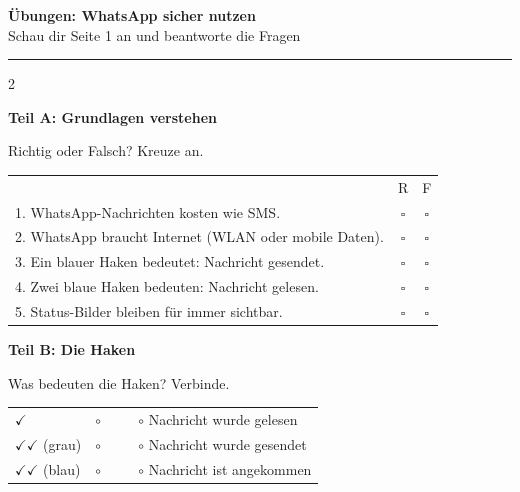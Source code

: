 \documentclass[a4paper,landscape,8pt]{extarticle}
\begin{document}
\newpage


\begin{center}
{\LARGE\bfseries Übungen: WhatsApp sicher nutzen}\\[3pt]
{\normalsize Schau dir Seite 1 an und beantworte die Fragen}
\end{center}

\vspace{3mm}
\hrule
\vspace{4mm}

\begin{multicols}{2}

\textbf{\large Teil A: Grundlagen verstehen}

Richtig oder Falsch? Kreuze an.

\vspace{2mm}

\renewcommand{\arraystretch}{1.6}
\begin{tabular}{@{}p{8cm}cc@{}}
& R & F \\
1. WhatsApp-Nachrichten kosten wie SMS. & $\square$ & $\square$ \\
2. WhatsApp braucht Internet (WLAN oder mobile Daten). & $\square$ & $\square$ \\
3. Ein blauer Haken bedeutet: Nachricht gesendet. & $\square$ & $\square$ \\
4. Zwei blaue Haken bedeuten: Nachricht gelesen. & $\square$ & $\square$ \\
5. Status-Bilder bleiben für immer sichtbar. & $\square$ & $\square$ \\
\end{tabular}
\renewcommand{\arraystretch}{1}

\vspace{6mm}

\textbf{\large Teil B: Die Haken}

Was bedeuten die Haken? Verbinde.

\vspace{2mm}

\renewcommand{\arraystretch}{1.8}
\begin{tabular}{@{}p{3cm}p{4cm}@{}}
$\checkmark$ & $\circ$ ~~~~ $\circ$ Nachricht wurde gelesen \\
$\checkmark\checkmark$ (grau) & $\circ$ ~~~~ $\circ$ Nachricht wurde gesendet \\
$\checkmark\checkmark$ (blau) & $\circ$ ~~~~ $\circ$ Nachricht ist angekommen \\
\end{tabular}
\renewcommand{\arraystretch}{1}


\end{multicols}
\end{document}
